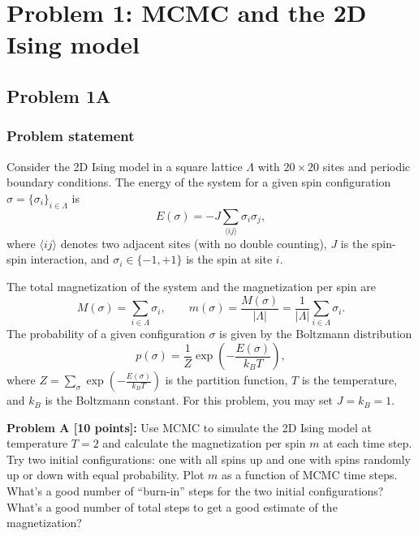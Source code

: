 \documentclass[11pt]{article}
\numberwithin{equation}{section}
\begin{document}
\section{Problem 1: MCMC and the 2D Ising model}

\subsection{Problem 1A}\label{sec:1a}

\subsubsection*{Problem statement}
\begin{statement}
Consider the 2D Ising model in a square lattice $\Lambda$ with $20\times20$ sites and periodic boundary conditions. The energy of the system for a given spin configuration $\sigma=\{\sigma_i\}_{i\in\Lambda}$ is
\begin{equation*}
E(\sigma)=-J\sum_{\langle ij\rangle}\sigma_i\sigma_j,\tag{1}
\end{equation*}
where $\langle ij\rangle$ denotes two adjacent sites (with no double counting), $J$ is the spin-spin interaction, and $\sigma_i\in\{-1,+1\}$ is the spin at site $i$.

The total magnetization of the system and the magnetization per spin are
\begin{equation*}
M(\sigma)=\sum_{i\in\Lambda}\sigma_i,\qquad m(\sigma)=\frac{M(\sigma)}{|\Lambda|}=\frac{1}{|\Lambda|}\sum_{i\in\Lambda}\sigma_i.\tag{2}
\end{equation*}
The probability of a given configuration $\sigma$ is given by the Boltzmann distribution
\begin{equation*}
p(\sigma)=\frac1Z\exp\!\left(-\frac{E(\sigma)}{k_BT}\right),\tag{3}
\end{equation*}
where $Z=\sum_\sigma\exp\!\left(-\frac{E(\sigma)}{k_BT}\right)$ is the partition function, $T$ is the temperature, and $k_B$ is the Boltzmann constant. For this problem, you may set $J=k_B=1$.

\medskip
\textbf{Problem A [10 points]:} Use MCMC to simulate the 2D Ising model at temperature $T=2$ and calculate the magnetization per spin $m$ at each time step. Try two initial configurations: one with all spins up and one with spins randomly up or down with equal probability. Plot $m$ as a function of MCMC time steps. What's a good number of ``burn-in'' steps for the two initial configurations? What's a good number of total steps to get a good estimate of the magnetization?
\end{statement}
\end{document}
